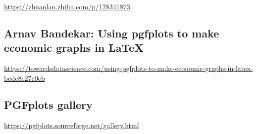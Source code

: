 \documentclass[
]{book}
\theoremstyle{definition}
\theoremstyle{definition}
\theoremstyle{definition}
\theoremstyle{definition}
\theoremstyle{remark}
\begin{document}
\url{https://zhuanlan.zhihu.com/p/128341873}

\hypertarget{arnav-bandekar-using-pgfplots-to-make-economic-graphs-in-latex}{%
\subsection{Arnav Bandekar: Using pgfplots to make economic graphs in LaTeX}\label{arnav-bandekar-using-pgfplots-to-make-economic-graphs-in-latex}}

\url{https://towardsdatascience.com/using-pgfplots-to-make-economic-graphs-in-latex-bcdc8e27c0eb}

\hypertarget{pgfplots-gallery}{%
\subsection{PGFplots gallery}\label{pgfplots-gallery}}

\url{https://pgfplots.sourceforge.net/gallery.html}
\end{document}
